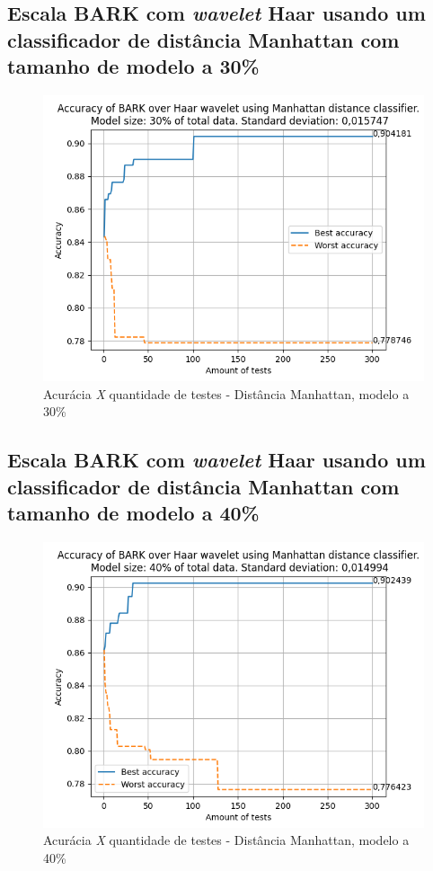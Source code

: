 		\newpage
		\subsection{Escala BARK com \textit{wavelet} Haar usando um classificador de distância Manhattan com tamanho de modelo a 30\%}
		\begin{figure}[ht]
			\centering
			\includegraphics{images/results/confusionMatrices/classifier_Manhattan_30.png}
			\caption{Acurácia \textit{X} quantidade de testes - Distância Manhattan, modelo a 30\%}
			\label{fig:classifiermanhattan30}
		\end{figure}
		
		
		\newpage
		\subsection{Escala BARK com \textit{wavelet} Haar usando um classificador de distância Manhattan com tamanho de modelo a 40\%}
		\begin{figure}[ht]
			\centering
			\includegraphics{images/results/confusionMatrices/classifier_Manhattan_40.png}
			\caption{Acurácia \textit{X} quantidade de testes - Distância Manhattan, modelo a 40\%}
			\label{fig:classifiermanhattan40}
		\end{figure}
		
		
